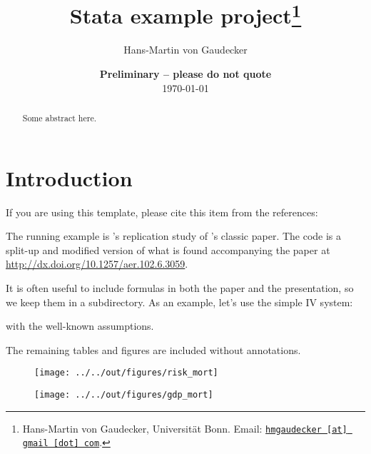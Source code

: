 \documentclass[11pt, a4paper, leqno]{article}
\begin{document}
\title{Stata example project\thanks{Hans-Martin von Gaudecker, Universität Bonn. Email: \href{mailto:hmgaudecker [at] gmail [dot] com}{\nolinkurl{hmgaudecker [at] gmail [dot] com}}.}}

\author{Hans-Martin von Gaudecker}

\date{
{\bf Preliminary -- please do not quote} 
\\[1ex] 
\today
}

\maketitle


\begin{abstract}
	Some abstract here.
\end{abstract}
\clearpage

\section{Introduction} %
\label{sec:introduction}

If you are using this template, please cite this item from the references: \citet{GaudeckerEconProjectTemplates}

The running example is \citeauthor{Albouy12}'s \citeyear{Albouy12} replication study of \citeauthor{AcemogluJohnsonRobinson01}'s classic \citeyear{AcemogluJohnsonRobinson01} paper. The code is a split-up and modified version of what is found accompanying the paper at \url{http://dx.doi.org/10.1257/aer.102.6.3059}.

It is often useful to include formulas in both the paper and the presentation, so we keep them in a subdirectory. As an example, let's use the simple IV system:

with the well-known assumptions.

The remaining tables and figures are included without annotations.\\[4ex]







\begin{figure}
	\texttt{[image: ../../out/figures/risk\_mort]}
\end{figure}


\begin{figure}
	\texttt{[image: ../../out/figures/gdp\_mort]}
\end{figure}







\clearpage
{}
\printbibliography
{}

\end{document}
